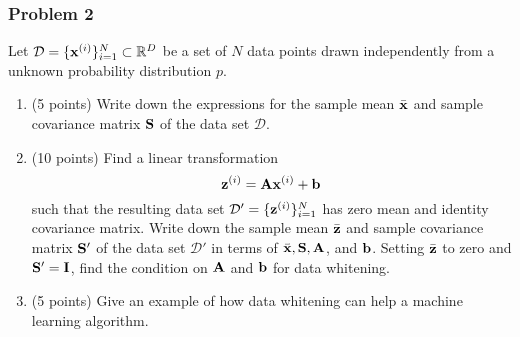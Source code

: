 \documentclass[12pt,a4paper]{article}
\renewcommand{\v}[1]{\ifmmode\mathbf{#1}\fi}
\def\R{\ifmmode\mathbb R\fi}
\begin{document}
\newpage
\subsubsection*{Problem 2}
Let $\mathcal D = \{\v x^{(i)} \}_{i=1}^N \subset \R^D$ be a set of $N$ data points drawn independently from a unknown probability distribution $p$. 
\begin{enumerate}[label=(\alph*)]
	\item (5 points)
	Write down the expressions for the sample mean $\bar{\v x}$ and sample covariance matrix $\v S$ of the data set $\mathcal D$.
	\item (10 points)
	Find a linear transformation 
	\begin{equation*}
	\v z^{(i)} = \v A\v x^{(i)} + \v b
	\end{equation*}
	such that the resulting data set $\mathcal D' = \{ \v z^{(i)} \}_{i=1}^N$ has zero mean and identity covariance matrix. Write down the sample mean $\bar{\v z}$ and sample covariance matrix $\v S'$ of the data set $\mathcal D'$ in terms of $\bar{\v x}, \v S, \v A$, and $\v b$. Setting $\bar{\v z}$ to zero and $\v S' = \v I$, find the condition on $\v A$ and $\v b$ for data whitening.
	\item (5 points)
	Give an example of how data whitening can help a machine learning algorithm.
\end{enumerate}





\newpage
\end{document}
